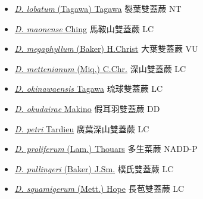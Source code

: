 \begin{itemize}
\begin{itemize}
        \item[] \href{http://www.theplantlist.org/tpl1.1/search?q=Diplazium+lobatum}{\textit{D. lobatum} (Tagawa) Tagawa}   裂葉雙蓋蕨 NT
        \item[] \href{http://www.theplantlist.org/tpl1.1/search?q=Diplazium+maonense}{\textit{D. maonense} Ching}   馬鞍山雙蓋蕨 LC
        \item[] \href{http://www.theplantlist.org/tpl1.1/search?q=Diplazium+megaphyllum}{\textit{D. megaphyllum} (Baker) H.Christ}   大葉雙蓋蕨 VU
        \item[] \href{http://www.theplantlist.org/tpl1.1/search?q=Diplazium+mettenianum}{\textit{D. mettenianum} (Miq.) C.Chr.}   深山雙蓋蕨 LC
        \item[] \href{http://www.theplantlist.org/tpl1.1/search?q=Diplazium+okinawaensis}{\textit{D. okinawaensis} Tagawa}   琉球雙蓋蕨 LC
        \item[] \href{http://www.theplantlist.org/tpl1.1/search?q=Diplazium+okudairae}{\textit{D. okudairae} Makino}   假耳羽雙蓋蕨 DD
        \item[] \href{http://www.theplantlist.org/tpl1.1/search?q=Diplazium+petri}{\textit{D. petri} Tardieu}   廣葉深山雙蓋蕨 LC
        \item[] \href{http://www.theplantlist.org/tpl1.1/search?q=Diplazium+proliferum}{\textit{D. proliferum} (Lam.) Thouars}   多生菜蕨 NADD-P
        \item[] \href{http://www.theplantlist.org/tpl1.1/search?q=Diplazium+pullingeri}{\textit{D. pullingeri} (Baker) J.Sm.}   樸氏雙蓋蕨 LC
        \item[] \href{http://www.theplantlist.org/tpl1.1/search?q=Diplazium+squamigerum}{\textit{D. squamigerum} (Mett.) Hope}   長苞雙蓋蕨 LC

\end{itemize}
\end{itemize}
